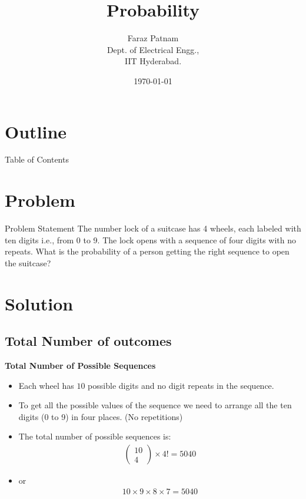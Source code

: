\documentclass{beamer}
\title{Probability}
\author{Faraz Patnam\\ Dept. of Electrical Engg.,\\IIT Hyderabad.}
\date{\today}
\theoremstyle{remark}
\newcommand{\myvec}[1]{\ensuremath{\begin{pmatrix}#1\end{pmatrix}}}
\numberwithin{equation}{section}
\begin{document}
\begin{frame}
\titlepage
\end{frame}

\section*{Outline}
\begin{frame}{Table of Contents}
    \tableofcontents
\end{frame}

\section{Problem}
\begin{frame}{Problem Statement}
    The number lock of a suitcase has 4 wheels, each labeled with ten digits i.e., from 0 to 9. The lock opens with a sequence of four digits with no repeats. What is the probability of a person getting the right sequence to open the suitcase?
\end{frame}

\section{Solution}
\subsection{Total Number of outcomes}
\begin{frame}{\textbf{Total Number of Possible Sequences}}
    \begin{itemize}
        \item Each wheel has $10$ possible digits and no digit repeats in the sequence.
        \item To get all the possible values of the sequence we need to arrange all the ten digits (0 to 9) in four places. (No repetitions)
        \item The total number of possible sequences is:
        \begin{align}
            \myvec{10 \\ 4} \times {4!} = 5040
        \end{align}
        \item or 
        \begin{align}
            10 \times 9 \times 8 \times 7 = 5040
        \end{align}
    \end{itemize}
\end{frame}
\end{document}
